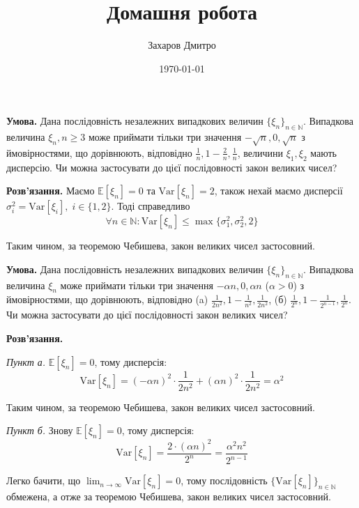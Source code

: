 \documentclass[oneside,solution]{karazin-prob-theory-assign}
\title{Домашня робота}
\author{Захаров Дмитро}
\date{\today}
\begin{document}
\maketitle



\hspace{20px}\textbf{Умова.} Дана послідовність незалежних випадкових величин $\{\xi_n\}_{n \in \mathbb{N}}$. Випадкова величина $\xi_n, n \geq 3$ може приймати тільки три значення $-\sqrt{n},0,\sqrt{n}$ з ймовірностями, що дорівнюють, відповідно $\frac{1}{n},1-\frac{2}{n},\frac{1}{n}$, величини $\xi_1,\xi_2$ мають дисперсію. Чи можна застосувати до цієї послідовності закон великих чисел?

\textbf{Розв'язання.} Маємо $\mathbb{E}[\xi_n]=0$ та $\text{Var}[\xi_n] = 2$, також нехай маємо дисперсії $\sigma_i^2 = \text{Var}[\xi_i],\; i\in\{1,2\}$. Тоді справедливо
\begin{equation}
    \forall n \in \mathbb{N}: \text{Var}[\xi_n] \leq \max\{\sigma_1^2, \sigma_2^2, 2\}
\end{equation}

Таким чином, за теоремою Чебишева, закон великих чисел застосовний.


\hspace{20px}\textbf{Умова.} Дана послідовність незалежних випадкових величин $\{\xi_n\}_{n \in \mathbb{N}}$. Випадкова величина $\xi_n$ може приймати тільки три значення $-\alpha n, 0, \alpha n$ ($\alpha>0$) з ймовірностями, що дорівнюють, відповідно (a) $\frac{1}{2n^2},1-\frac{1}{n^2},\frac{1}{2n^2}$, (б) $\frac{1}{2^n},1-\frac{1}{2^{n-1}},\frac{1}{2^n}$. Чи можна застосувати до цієї послідовності закон великих чисел?

\textbf{Розв'язання.} 

\textit{Пункт а.} $\mathbb{E}[\xi_n]=0$, тому дисперсія:
\begin{equation}
    \text{Var}[\xi_n] = (-\alpha n)^2 \cdot \frac{1}{2n^2} + (\alpha n)^2 \cdot \frac{1}{2n^2} = \alpha^2
\end{equation}

Таким чином, за теоремою Чебишева, закон великих чисел застосовний.

\textit{Пункт б.} Знову $\mathbb{E}[\xi_n]=0$, тому дисперсія:
\begin{equation}
    \text{Var}[\xi_n] = \frac{2 \cdot (\alpha n)^2}{2^n} = \frac{\alpha^2 n^2}{2^{n-1}}
\end{equation}

Легко бачити, що $\lim_{n \to \infty} \text{Var}[\xi_n] = 0$, тому послідовність $\{\text{Var}[\xi_n]\}_{n \in \mathbb{N}}$ обмежена, а отже за теоремою Чебишева, закон великих чисел застосовний.
\end{document}
